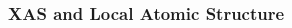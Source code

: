 \documentclass[10pt, xcolor=x11names, compress, handout]{beamer}
\begin{document}
\begin{frame}
  \frametitle{XAS and Local Atomic Structure}
  \begin{columns}[T]
    \begin{column}{0.34\linewidth}



\end{column}
\end{columns}
\end{frame}
\end{document}
